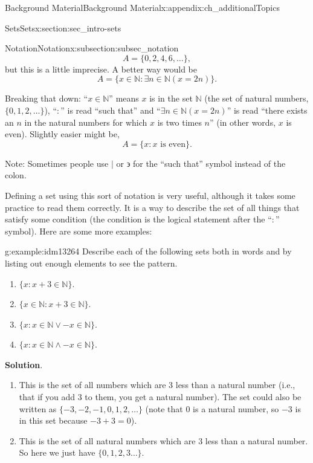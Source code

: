 \documentclass[oneside,10pt,]{book}
\numberwithin{equation}{chapter}
\def\N{\mathbb N}
\def\st{:}
\begin{document}
\begin{appendixptx}{Background Material}{}{Background Material}{}{}{x:appendix:ch_additionalTopics}
\begin{sectionptx}{Sets}{}{Sets}{}{}{x:section:sec_intro-sets}
\begin{subsectionptx}{Notation}{}{Notation}{}{}{x:subsection:subsec_notation}
\begin{equation*}
A = \{0, 2, 4, 6, \ldots\},
\end{equation*}
but this is a little imprecise. A better way would be%
\begin{equation*}
A = \{x \in \N \st \exists n\in \N ( x = 2 n)\}.
\end{equation*}
%
\par
Breaking that down: ``\(x \in \N\)'' means \(x\) is in the set \(\N\) (the set of natural numbers, \(\{0,1,2,\ldots\}\)), ``\(:\)'' is read ``such that'' and ``\(\exists n\in \N (x = 2n) \)'' is read ``there exists an \(n\) in the natural numbers for which \(x\) is two times \(n\)'' (in other words, \(x\) is even). Slightly easier might be,%
\begin{equation*}
A = \{x \st x\text{ is even} \}.
\end{equation*}
%
\par
Note: Sometimes people use \(|\) or \(\backepsilon\) for the ``such that'' symbol instead of the colon.%
\par
Defining a set using this sort of notation is very useful, although it takes some practice to read them correctly. It is a way to describe the set of all things that satisfy some condition (the condition is the logical statement after the ``\(\st\)'' symbol). Here are some more examples:%
\begin{example}{}{g:example:idm13264}%
Describe each of the following sets both in words and by listing out enough elements to see the pattern.%
\par
%
\begin{enumerate}
\item{}\(\{x \st x + 3 \in \N\}\).%
\item{}\(\{x \in \N \st x + 3 \in \N\}\).%
\item{}\(\{x \st x \in \N \vee -x \in \N\}\).%
\item{}\(\{x \st x \in \N \wedge -x \in \N\}\).%
\end{enumerate}
%
\par\smallskip%
\noindent\textbf{Solution}.\hypertarget{g:solution:idm13277}{}\quad{}%
\begin{enumerate}
\item{}This is the set of all numbers which are 3 less than a natural number (i.e., that if you add 3 to them, you get a natural number). The set could also be written as \(\{-3, -2, -1, 0, 1, 2, \ldots\}\) (note that 0 is a natural number, so \(-3\) is in this set because \(-3 + 3 = 0\)).%
\item{}This is the set of all natural numbers which are 3 less than a natural number. So here we just have \(\{0, 1, 2,3 \ldots\}\).%

\end{enumerate}
\end{example}
\end{subsectionptx}
\end{sectionptx}
\end{appendixptx}
\end{document}
